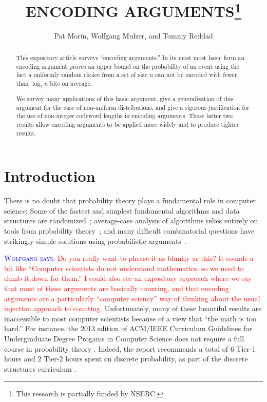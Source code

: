 \documentclass{patmorin}
\title{\MakeUppercase{Encoding Arguments}\thanks{This research is partially funded by NSERC.}}
\author{Pat Morin, Wolfgang Mulzer, and Tommy Reddad}
\date{}
\newcommand{\aremark}[3]{\textcolor{blue}{\textsc{#1 #2:}}
  \textcolor{red}{\textsf{#3}}}
\newcommand{\wolfgang}[2][says]{\aremark{Wolfgang}{#1}{#2}}
\begin{document}
\begin{titlepage}
\maketitle


\begin{abstract}
  \setlength{\baselineskip}{15.84pt}

  This expository article surveys ``encoding arguments.'' In its
  most most basic form an encoding argument proves an upper bound on
  the probability of an event using the fact a uniformly random choice
  from a set of size $n$ can not be encoded with fewer than $\log_2 n$
  bits on average.

  We survey many applications of this basic argument, give a
  generalization of this argument for the case of non-uniform
  distributions, and give a rigorous justification for the use of
  non-integer codeword lengths in encoding arguments.  These latter
  two results allow encoding arguments to be applied more widely and
  to produce tighter results.
\end{abstract}


\end{titlepage}
\tableofcontents
\newpage
{}

\section{Introduction}
\setlength{\baselineskip}{15.84pt}

There is no doubt that probability theory plays a fundamental role in
computer science: Some of the fastest and simplest fundamental
algorithms and data structures are randomized~\cite{mitzenmacher.upfal:probability, motwani.raghavan:randomized}; 
average-case analysis of algorithms relies entirely on tools from probability 
theory~\cite{flajolet.sedgewick:aofa}; and
many difficult combinatorial questions have strikingly simple
solutions using probabilistic arguments~\cite{alon:probabilistic}.

\wolfgang{Do you really want to phrase it as bluntly as this?
It sounds a bit like ``Computer scientists do not understand
mathematics, so we need to dumb it down for them.''
I could also see an expository approach where we say that
most of these arguments are basically counting, and that
encoding arguments are a particularly ``computer sciency''
way of thinking about the usual injection approach to counting.}
Unfortunately, many of these beautiful results are inaccessible to
most computer scientists because of a view that ``the math is too
hard.''  For instance, the 2013 edition of ACM/IEEE Curriculum
Guidelines for Undergraduate Degree Progams in Computer Science does
not require a full course in probability theory
\cite[Page~50]{computing-curricula:computer}. Indeed, the report
recommends a total of 6 Tier-1 hours and 2 Tier-2 hours spent on
discrete probability, as part of the discrete structures curriculum
\cite[Page~77]{computing-curricula:computer}.
\end{document}
